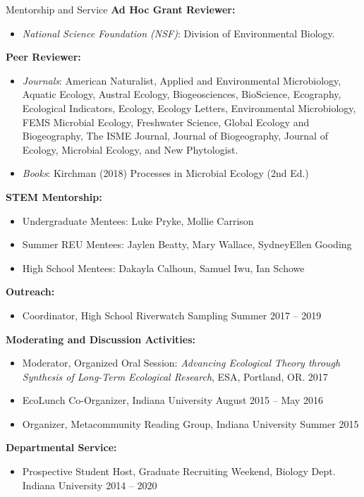 \documentclass{resume} %
\begin{document}
\begin{rSection}{Mentorship and Service}
{\bf Ad Hoc Grant Reviewer:}
\begin{itemize}
  \item {\em National Science Foundation (NSF)}: Division of Environmental Biology.
\end{itemize}

{\bf Peer Reviewer:}
\begin{itemize}
  \item {\em Journals}: American Naturalist, Applied and Environmental Microbiology, Aquatic Ecology, Austral Ecology, Biogeosciences, BioScience, Ecography, Ecological Indicators, Ecology, Ecology Letters, Environmental Microbiology, FEMS Microbial Ecology, Freshwater Science, Global Ecology and Biogeography, The ISME Journal, Journal of Biogeography, Journal of Ecology, Microbial Ecology, and New Phytologist.
  \item {\em Books}: Kirchman (2018) Processes in Microbial Ecology (2nd Ed.)
\end{itemize}

{\bf STEM Mentorship:}
\begin{itemize}
  \item Undergraduate Mentees: Luke Pryke, Mollie Carrison
  \item Summer REU Mentees: Jaylen Beatty, Mary Wallace, SydneyEllen Gooding
  \item High School Mentees: Dakayla Calhoun, Samuel Iwu, Ian Schowe
\end{itemize}

{\bf Outreach:}
\begin{itemize}
  \item {Coordinator, High School Riverwatch Sampling} \hfill Summer 2017 -- 2019
\end{itemize}

{\bf Moderating and Discussion Activities:}
\begin{itemize}
  \item Moderator, Organized Oral Session: {\em Advancing Ecological Theory through Synthesis of Long-Term Ecological Research}, ESA, Portland, OR. \hfill 2017
  \item EcoLunch Co-Organizer, Indiana University \hfill August 2015 -- May 2016
  \item Organizer, Metacommunity Reading Group, Indiana University \hfill Summer 2015
\end{itemize}

{\bf Departmental Service:}
\begin{itemize}
  \item Prospective Student Host, Graduate Recruiting Weekend, Biology Dept. Indiana University \hfill 2014 -- 2020
\end{itemize}

\end{rSection}
\bigskip
\end{document}

